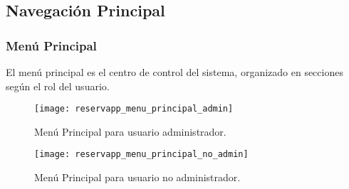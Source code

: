 \newpage

\subsection{Navegación Principal}

\subsubsection{Menú Principal}
El menú principal es el centro de control del sistema, organizado en secciones según el rol del usuario.

\begin{figure}[H]
	\centering
		\texttt{[image: reservapp\_menu\_principal\_admin]}
	\caption{Menú Principal para usuario administrador.}
	\label{fig:reservapp_menu_principal_admin}
\end{figure}

\begin{figure}[H]
	\centering
		\texttt{[image: reservapp\_menu\_principal\_no\_admin]}
	\caption{Menú Principal para usuario no administrador.}
	\label{fig:reservapp_menu_principal_no_admin}
\end{figure}

